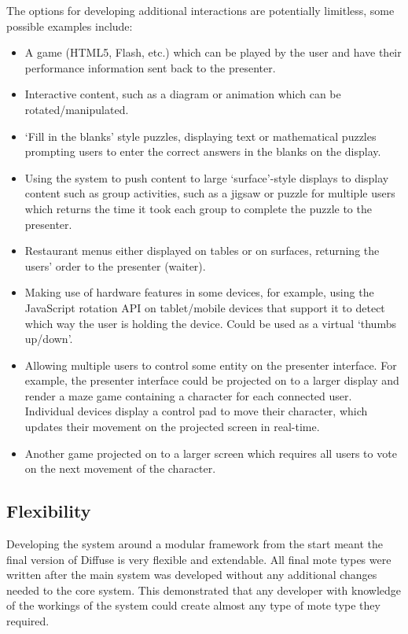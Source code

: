 \documentclass[a4papert,11pt,notitlepage]{article}
\begin{document}
The options for developing additional interactions are potentially limitless, some possible examples include:
\begin{itemize}
\item A game (HTML5, Flash, etc.) which can be played by the user and have their performance information sent back to the presenter.
\item Interactive content, such as a diagram or animation which can be rotated/manipulated.
\item `Fill in the blanks' style puzzles, displaying text or mathematical puzzles prompting users to enter the correct answers in the blanks on the display.
\item Using the system to push content to large `surface'-style displays to display content such as group activities, such as a jigsaw or puzzle for multiple users which returns the time it took each group to complete the puzzle to the presenter.
\item Restaurant menus either displayed on tables or on surfaces, returning the users' order to the presenter (waiter).
\item Making use of hardware features in some devices, for example, using the JavaScript rotation API on tablet/mobile devices that support it to detect which way the user is holding the device. Could be used as a virtual `thumbs up/down'.
\item Allowing multiple users to control some entity on the presenter interface. For example, the presenter interface could be projected on to a larger display and render a maze game containing a character for each connected user. Individual devices display a control pad to move their character, which updates their movement on the projected screen in real-time.
\item Another game projected on to a larger screen which requires all users to vote on the next movement of the character.
\end{itemize}

\subsection{Flexibility}
Developing the system around a modular framework from the start meant the final version of Diffuse is very flexible and extendable. All final mote types were written after the main system was developed without any additional changes needed to the core system. This demonstrated that any developer with knowledge of the workings of the system could create almost any type of mote type they required.
\end{document}
